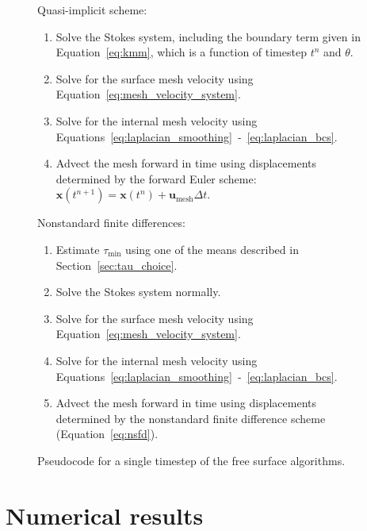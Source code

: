 \documentclass[preprint,12pt,authoryear]{elsarticle}
\begin{document}
\begin{figure}
\centering

{Quasi-implicit scheme:}

\begin{mdframed}[backgroundcolor=gray!20]
{\small
\begin{enumerate}
  \item Solve the Stokes system, including the boundary term given in Equation~\eqref{eq:kmm}, 
    which is a function of timestep $t^n$ and $\theta$.
  \item Solve for the surface mesh velocity using Equation~\eqref{eq:mesh_velocity_system}.
  \item Solve for the internal mesh velocity using Equations~\eqref{eq:laplacian_smoothing}~-~\eqref{eq:laplacian_bcs}.
  \item Advect the mesh forward in time using displacements determined by the forward Euler scheme: $\mathbf{x}(t^{n+1}) = \mathbf{x}(t^n) + \mathbf{u}_\mathrm{mesh}\Delta t$.
\end{enumerate} 
}
\end{mdframed}

{Nonstandard finite differences:}

\begin{mdframed}[backgroundcolor=gray!20]
{\small
\begin{enumerate}
  \item Estimate $\tau_\mathrm{min}$ using one of the means described in Section~\ref{sec:tau_choice}.
  \item Solve the Stokes system normally.
  \item Solve for the surface mesh velocity using Equation~\eqref{eq:mesh_velocity_system}.
  \item Solve for the internal mesh velocity using Equations~\eqref{eq:laplacian_smoothing}~-~\eqref{eq:laplacian_bcs}.
  \item Advect the mesh forward in time using displacements determined by the nonstandard finite difference scheme (Equation~\eqref{eq:nsfd}).
\end{enumerate}
\vspace{1.4mm}
}
\end{mdframed}


\caption{Pseudocode for a single timestep of the free surface algorithms.}
\label{fig:pseudocode}
\end{figure}


\section{Numerical results}
\label{sec:results}
\end{document}
